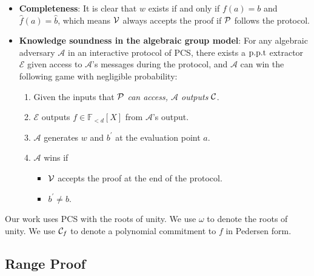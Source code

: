 \begin{definition}
\begin{enumerate}
\end{enumerate}
\begin{itemize}
    \item \textbf{Completeness}: It is clear that $w$ exists if and only if $f(a)=b$ and $\hat{f}(a)=\hat{b}$, which means $\mathcal{V}$ always accepts the proof if $\mathcal{P}$ follows the protocol.
    \item \textbf{Knowledge soundness in the algebraic group model}: For any algebraic adversary $\mathcal{A}$ in an interactive protocol of PCS, there exists a $\text{p.p.t}$ extractor $\mathcal{E}$ given access to $\mathcal{A}$'s messages during the protocol, and $\mathcal{A}$ can win the following game with negligible probability:
    \begin{enumerate}
        \item Given the inputs that $\mathcal{P}$ \textit{can access, $\mathcal{A}$ outputs} $\mathcal{C}$.
        \item $\mathcal{E}$ outputs $f\in\mathbb{F}_{<d}[X]$ from $\mathcal{A}$'s output.
        \item $\mathcal{A}$ generates $w$ and $b^\prime$ at the evaluation point $a$.
        \item $\mathcal{A}$ wins if
        \begin{itemize}
            \item $\mathcal{V}$ accepts the proof at the end of the protocol.
            \item $b^\prime\ne{b}$.
        \end{itemize}
    \end{enumerate}
\end{itemize}
\end{definition}
Our work uses PCS with the roots of unity. We use $\omega$ to denote the roots of unity. We use $\mathcal{C}_f$ to denote a polynomial commitment to $f$ in Pedersen form.

\subsection{Range Proof}
\label{sec:range}

